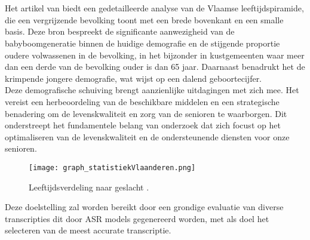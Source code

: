 
\chapter{}%
\label{ch:inleiding}


Het artikel van \textcite{StatistiekVlaanderen2023} biedt een gedetailleerde analyse van de Vlaamse leeftijdspiramide, die een vergrijzende bevolking toont met een brede bovenkant en een smalle basis. Deze bron bespreekt de significante aanwezigheid van de babyboomgeneratie binnen de huidige demografie en de stijgende proportie oudere volwassenen in de bevolking, in het bijzonder in kustgemeenten waar meer dan een derde van de bevolking ouder is dan 65 jaar. Daarnaast benadrukt het de krimpende jongere demografie, wat wijst op een dalend geboortecijfer. 
\\
Deze demografische schuiving brengt aanzienlijke uitdagingen met zich mee. Het vereist een herbeoordeling van de beschikbare middelen en een strategische benadering om de levenskwaliteit en zorg van de senioren te waarborgen. Dit onderstreept het fundamentele belang van onderzoek dat zich focust op het optimaliseren van de levenskwaliteit en de ondersteunende diensten voor onze senioren.
\begin{figure}[h]
    \centering
    \texttt{[image: graph\_statistiekVlaanderen.png]}
    \captionsetup{justification=centering}
    \caption{Leeftijdsverdeling naar geslacht \textcite{StatistiekVlaanderen2023}.}
    \label{fig:plan_methodologie}
\end{figure}
\FloatBarrier

Deze doelstelling zal worden bereikt door een grondige evaluatie van diverse transcripties dit door ASR models gegenereerd worden, met als doel het selecteren van de meest accurate transcriptie.
